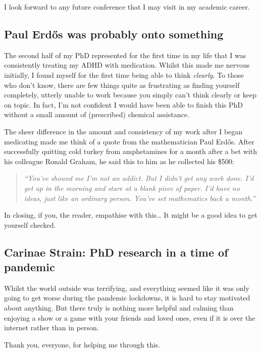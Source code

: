 I look forward to any future conference that I may visit in my academic career.

\subsection{Paul Erd\H{o}s was probably onto something}

The second half of my PhD represented for the first time in my life that I was consistently treating my ADHD with medication.
Whilst this made me nervous initially, I found myself for the first time being able to think \emph{clearly}.
To those who don't know, there are few things quite as frustrating as finding yourself completely, utterly unable to work because you simply can't think clearly or keep on topic.
In fact, I'm not confident I would have been able to finish this PhD without a small amount of (prescribed) chemical assistance.

The sheer difference in the amount and consistency of my work after I began medicating made me think of a quote from the mathematician Paul Erd\H{o}s.
After successfully quitting cold turkey from amphetamines for a month after a bet with his colleague Ronald Graham, he said this to him as he collected his \$500:

\begin{quote}
  \emph{
  \noindent
  ``You've showed me I'm not an addict. But I didn't get any work done. I'd get up in the morning and stare at a blank piece of paper. I'd have no ideas, just like an ordinary person. You've set mathematics back a month.''
  }
\end{quote}

\noindent
In closing, if you, the reader, empathise with this\ldots{} It might be a good idea to get yourself checked.

\subsection{Carinae Strain: PhD research in a time of pandemic}
\label{sec:pandemic}

Whilst the world outside was terrifying, and everything seemed like it was only going to get worse during the pandemic lockdowns, it is hard to stay motivated about anything.
But there truly is nothing more helpful and calming than enjoying a show or a game with your friends and loved ones, even if it is over the internet rather than in person.

\begin{center}
  Thank you, everyone, for helping me through this.
\end{center}

